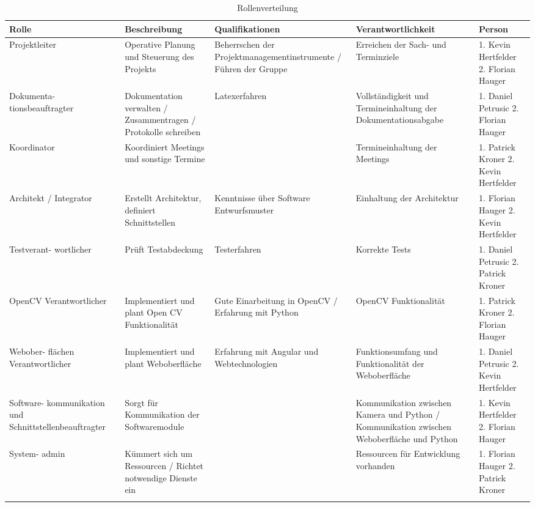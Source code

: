 \begin{longtable}[]{|p{}|p{}|p{}|p{}|p{}|}
\cline{1-5}
\textbf{Rolle} & \textbf{Beschreibung} &\textbf{Qualifikationen} & \textbf{Verantwortlichkeit} & \textbf{Person} \\ \hline

Projektleiter & 
Operative Planung und Steuerung des Projekts & 
Beherrschen der Projektmanagementinstrumente /
Führen der Gruppe &
Erreichen der Sach- und Terminziele &
1. Kevin Hertfelder
2. Florian Hauger \\ \hline

Dokumenta- tionsbeauftragter &
Dokumentation verwalten /
Zusammentragen /
Protokolle schreiben &
Latexerfahren &
Vollständigkeit und Termineinhaltung der Dokumentationsabgabe &
1. Daniel Petrusic
2. Florian Hauger \\ \hline

Koordinator &
Koordiniert Meetings und sonstige Termine &
&
Termineinhaltung der Meetings &
1. Patrick Kroner
2. Kevin Hertfelder \\ \hline

Architekt / Integrator &
Erstellt Architektur, definiert Schnittstellen & 
Kenntnisse über Software Entwurfsmuster &
Einhaltung der Architektur & 
1. Florian Hauger
2. Kevin Hertfelder \\ \hline

Testverant- wortlicher &
Prüft Testabdeckung & 
Testerfahren &
Korrekte Tests &
1. Daniel Petrusic
2. Patrick Kroner \\ \hline

OpenCV Verantwortlicher &
Implementiert und plant Open CV Funktionalität &
Gute Einarbeitung in OpenCV /
Erfahrung mit Python &
OpenCV Funktionalität &
1. Patrick Kroner
2. Florian Hauger  \\ \hline

Webober- flächen Verantwortlicher &
Implementiert und plant Weboberfläche &
Erfahrung mit Angular und Webtechnologien &
Funktionsumfang und Funktionalität der Weboberfläche &
1. Daniel Petrusic
2. Kevin Hertfelder  \\ \hline

Software- kommunikation und Schnittstellenbeauftragter &
Sorgt für Kommunikation der Softwaremodule &
&
Kommunikation zwischen Kamera und Python /
Kommunikation zwischen Weboberfläche und Python &
1. Kevin Hertfelder
2. Florian Hauger  \\ \hline

System- admin &
Kümmert sich um Ressourcen /
Richtet notwendige Dienste ein &
&
Ressourcen für Entwicklung vorhanden &
1. Florian Hauger
2. Patrick Kroner  \\ \hline

\caption{Rollenverteilung}
\label{tab:rollenverteilung}
\end{longtable}




